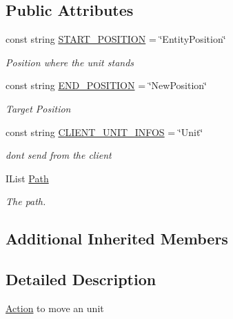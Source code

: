 \subsection*{Public Attributes}
\begin{DoxyCompactItemize}
\item 
const string \hyperlink{classCore_1_1Controllers_1_1Actions_1_1MoveUnit_aa00af18610776c1a0eebde8ae273286a}{S\+T\+A\+R\+T\+\_\+\+P\+O\+S\+I\+T\+I\+O\+N} = \char`\"{}Entity\+Position\char`\"{}
\begin{DoxyCompactList}\small\item\em Position where the unit stands \end{DoxyCompactList}\item 
const string \hyperlink{classCore_1_1Controllers_1_1Actions_1_1MoveUnit_a411193c1cf0e0784fbc3340dcc3cd21c}{E\+N\+D\+\_\+\+P\+O\+S\+I\+T\+I\+O\+N} = \char`\"{}New\+Position\char`\"{}
\begin{DoxyCompactList}\small\item\em Target Position \end{DoxyCompactList}\item 
const string \hyperlink{classCore_1_1Controllers_1_1Actions_1_1MoveUnit_ab1ae638f71301aab1dc5fb75162c6dad}{C\+L\+I\+E\+N\+T\+\_\+\+U\+N\+I\+T\+\_\+\+I\+N\+F\+O\+S} = \char`\"{}Unit\char`\"{}
\begin{DoxyCompactList}\small\item\em don\textquotesingle{}t send from the client \end{DoxyCompactList}\item 
I\+List \hyperlink{classCore_1_1Controllers_1_1Actions_1_1MoveUnit_a32d0ea3d4b02301de1b754a4e8bcaacd}{Path}
\begin{DoxyCompactList}\small\item\em The path. \end{DoxyCompactList}\end{DoxyCompactItemize}
\subsection*{Additional Inherited Members}


\subsection{Detailed Description}
\hyperlink{classCore_1_1Controllers_1_1Actions_1_1Action}{Action} to move an unit 



